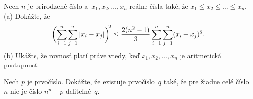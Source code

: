 {%
Nech $n$ je prirodzené číslo a~$x_1,x_2,\dots,x_n$ reálne čísla
také, že $x_1\le x_2\le \dots\le x_n$.
\ite{} \hskip-2pt(a)
Dokážte, že
$$
\biggl(\sum_{i=1}^n\sum_{j=1}^n|x_i-x_j|\biggr)^{\!2}\le
{2(n^2-1)\over3}\sum_{i=1}^n\sum_{j=1}^n(x_i-x_j)^2.
$$
\ite{} \hskip-2pt(b)
Ukážte, že rovnosť platí práve vtedy, keď $x_1,x_2,\dots,x_n$ je
aritmetická postupnosť.

}

{%
Nech $p$ je prvočíslo. Dokážte, že existuje prvočíslo~$q$
také, že pre žiadne celé číslo~$n$ nie je číslo $n^p-p$ deliteľné~$q$.}

